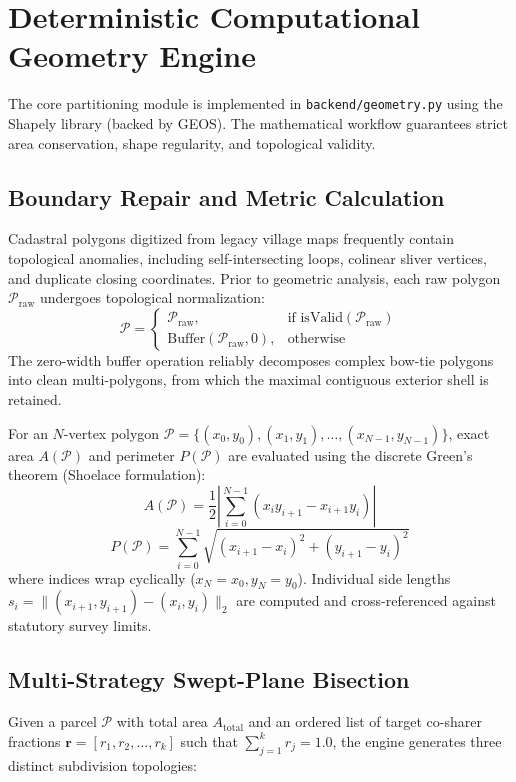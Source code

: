 \documentclass[conference]{IEEEtran}
\begin{document}
\section{Deterministic Computational Geometry Engine}

The core partitioning module is implemented in \texttt{backend/geometry.py} using the Shapely library (backed by GEOS). The mathematical workflow guarantees strict area conservation, shape regularity, and topological validity.

\subsection{Boundary Repair and Metric Calculation}
Cadastral polygons digitized from legacy village maps frequently contain topological anomalies, including self-intersecting loops, colinear sliver vertices, and duplicate closing coordinates. Prior to geometric analysis, each raw polygon $\mathcal{P}_{\text{raw}}$ undergoes topological normalization:
\begin{equation}
    \mathcal{P} = \begin{cases}
        \mathcal{P}_{\text{raw}}, & \text{if } \text{isValid}(\mathcal{P}_{\text{raw}}) \\
        \text{Buffer}(\mathcal{P}_{\text{raw}}, 0), & \text{otherwise}
    \end{cases}
\end{equation}
The zero-width buffer operation reliably decomposes complex bow-tie polygons into clean multi-polygons, from which the maximal contiguous exterior shell is retained.

For an $N$-vertex polygon $\mathcal{P} = \{(x_0, y_0), (x_1, y_1), \dots, (x_{N-1}, y_{N-1})\}$, exact area $A(\mathcal{P})$ and perimeter $P(\mathcal{P})$ are evaluated using the discrete Green's theorem (Shoelace formulation):
\begin{equation}
    A(\mathcal{P}) = \frac{1}{2} \left| \sum_{i=0}^{N-1} (x_i y_{i+1} - x_{i+1} y_i) \right|
    \label{eq:shoelace}
\end{equation}
\begin{equation}
    P(\mathcal{P}) = \sum_{i=0}^{N-1} \sqrt{(x_{i+1} - x_i)^2 + (y_{i+1} - y_i)^2}
    \label{eq:perimeter}
\end{equation}
where indices wrap cyclically ($x_N = x_0, y_N = y_0$). Individual side lengths $s_i = \|(x_{i+1}, y_{i+1}) - (x_i, y_i)\|_2$ are computed and cross-referenced against statutory survey limits.

\subsection{Multi-Strategy Swept-Plane Bisection}
Given a parcel $\mathcal{P}$ with total area $A_{\text{total}}$ and an ordered list of target co-sharer fractions $\mathbf{r} = [r_1, r_2, \dots, r_k]$ such that $\sum_{j=1}^k r_j = 1.0$, the engine generates three distinct subdivision topologies:
\end{document}
